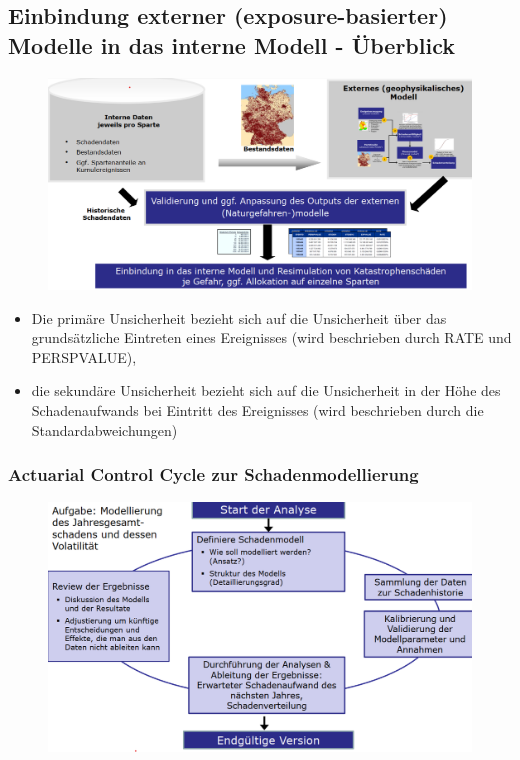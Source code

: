 \documentclass[12pt]{report}
\theoremstyle{dotless}
\theoremstyle{definition}
\begin{document}
\subsection{Einbindung externer (exposure-basierter) Modelle in das interne Modell -
Überblick}

\begin{figure}[ht]
	\centering
	\includegraphics[width= \textwidth]{Bilder/ExternesModell.png}
\end{figure}

\begin{itemize}
\item Die primäre Unsicherheit bezieht sich auf die Unsicherheit über das grundsätzliche Eintreten eines Ereignisses (wird beschrieben durch RATE und PERSPVALUE),
\item die sekundäre Unsicherheit bezieht sich auf die Unsicherheit in der Höhe des
Schadenaufwands bei Eintritt des Ereignisses (wird beschrieben durch die Standardabweichungen)
\end{itemize}


\subsubsection{Actuarial Control Cycle zur Schadenmodellierung}

\begin{figure}[ht]
	\centering
	\includegraphics[width= \textwidth]{Bilder/ControlCycle.png}
\end{figure}
\end{document}
